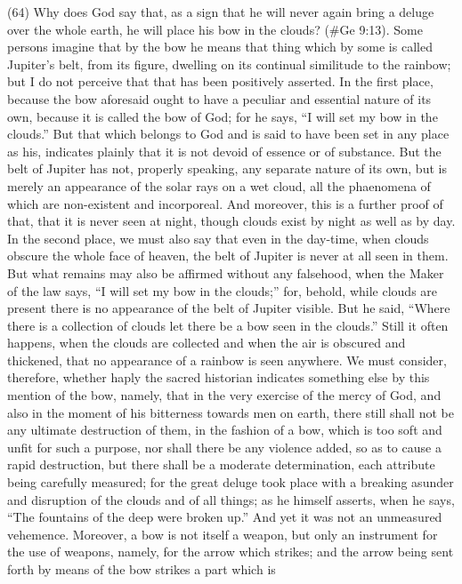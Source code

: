 (64) Why does God say that, as a sign that he will never again bring a deluge over the whole earth,
he will place his bow in the clouds? (\#Ge 9:13). Some persons imagine that by the bow he
means that thing which by some is called Jupiter's belt, from its figure, dwelling on its continual
similitude to the rainbow; but I do not perceive that that has been positively asserted. In the first
place, because the bow aforesaid ought to have a peculiar and essential nature of its own,
because it is called the bow of God; for he says, ``I will set my bow in the clouds.'' But that which
belongs to God and is said to have been set in any place as his, indicates plainly that it is not
devoid of essence or of substance. But the belt of Jupiter has not, properly speaking, any separate
nature of its own, but is merely an appearance of the solar rays on a wet cloud, all the
phaenomena of which are non-existent and incorporeal. And moreover, this is a further proof of
that, that it is never seen at night, though clouds exist by night as well as by day. In the second
place, we must also say that even in the day-time, when clouds obscure the whole face of heaven,
the belt of Jupiter is never at all seen in them. But what remains may also be affirmed without any
falsehood, when the Maker of the law says, ``I will set my bow in the clouds;'' for, behold, while
clouds are present there is no appearance of the belt of Jupiter visible. But he said, ``Where there
is a collection of clouds let there be a bow seen in the clouds.'' Still it often happens, when the
clouds are collected and when the air is obscured and thickened, that no appearance of a rainbow
is seen anywhere. We must consider, therefore, whether haply the sacred historian indicates
something else by this mention of the bow, namely, that in the very exercise of the mercy of God,
and also in the moment of his bitterness towards men on earth, there still shall not be any ultimate
destruction of them, in the fashion of a bow, which is too soft and unfit for such a purpose, nor shall
there be any violence added, so as to cause a rapid destruction, but there shall be a moderate
determination, each attribute being carefully measured; for the great deluge took place with a
breaking asunder and disruption of the clouds and of all things; as he himself asserts, when he
says, ``The fountains of the deep were broken up.'' And yet it was not an unmeasured vehemence.
Moreover, a bow is not itself a weapon, but only an instrument for the use of weapons, namely, for
the arrow which strikes; and the arrow being sent forth by means of the bow strikes a part which is
